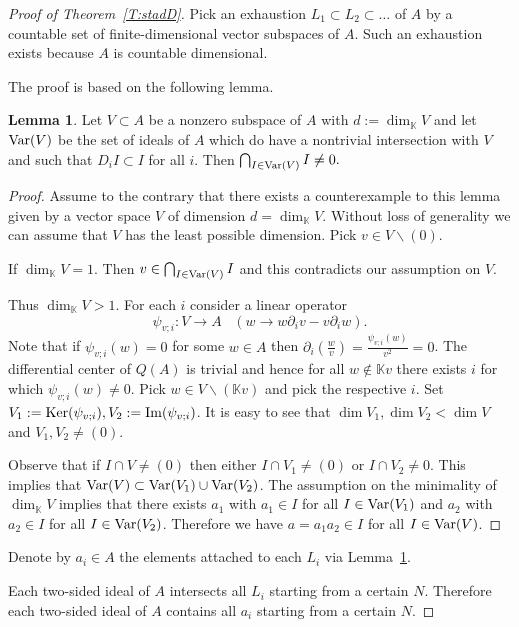 \documentclass{amsart} \textwidth=18.0cm \oddsidemargin=-1cm \evensidemargin=-1cm \topmargin=-1cm \textheight=23cm
\theoremstyle{definition}
\newtheorem{lemma}{Lemma}
\begin{document}
\begin{proof}[Proof of Theorem~\ref{T:stadD}] 

Pick an exhaustion $L_1\subset L_2\subset\ldots$ of $A$ by a countable set of finite-dimensional vector subspaces of $A$. 
Such an exhaustion exists because $A$ is countable dimensional. 

The proof is based on the following lemma.
\begin{lemma}\label{Lbslr1} 
Let $V\subset A$ be a nonzero subspace of $A$ with $d:=\dim_{\mathbb K} V$ and let ${\rm Var}(V)$ be the set of ideals of $A$ which do have a nontrivial intersection with $V$ and such that $D_iI\subset I$ for all $i$. 
Then $\bigcap_{I\in {\rm Var}(V)}I\ne0.$\end{lemma}
\begin{proof} Assume to the contrary that there exists a counterexample to this lemma given by a vector space $V$ of dimension $d=\dim_{\mathbb K}V$. 
Without loss of generality we can assume that $V$ has the least possible dimension. Pick $v\in V\backslash(0).$ 

If $\dim_{\mathbb K} V=1$. Then $v\in \bigcap_{I\in {\rm Var}(V)}I$ and this contradicts our assumption on $V$. 

Thus $\dim_{\mathbb K} V>1$. For each $i$ consider a linear operator $$\psi_{v; i}: V\to A \hspace{10pt}(w\to w\partial_iv-v\partial_iw).$$
Note that if $\psi_{v; i}(w)=0$ for some $w\in A$ then $\partial_i(\frac{w}{v})=\frac{\psi_{v; i}(w)}{v^2}=0$. 
The differential center of $Q(A)$ is trivial and hence for all $w\notin\mathbb K v$ there exists $i$ for which $\psi_{v; i}(w)\ne0$. 
Pick $w\in V\backslash(\mathbb K v)$ and pick the respective $i$. 
Set $V_1:={\rm Ker}(\psi_{v; i}), V_2:={\rm Im}(\psi_{v; i})$. 
It is easy to see that $\dim V_1, \dim V_2<\dim V$ and $V_1, V_2\ne (0)$.

Observe that if $I\cap V\ne(0)$ then either $I\cap V_1\ne(0)$ or $I\cap V_2\ne0$. 
This implies that ${\rm Var}(V)\subset{\rm Var}(V_1)\cup{\rm Var}(V_2)$. 
The assumption on the minimality of $\dim_{\mathbb K} V$ implies that there exists $a_1$ with $a_1\in I$ for all $I\in{\rm Var}(V_1)$ and $a_2$ with $a_2\in I$ for all $I\in{\rm Var}(V_2)$. 
Therefore we have $a=a_1a_2\in I$ for all $I\in{\rm Var}(V)$.
\end{proof}
Denote by $a_i\in A$ the elements attached to each $L_i$ via Lemma~\ref{Lbslr1}. 

Each two-sided ideal of $A$ intersects all $L_i$ starting from a certain $N$. 
Therefore each two-sided ideal of $A$ contains all $a_i$ starting from a certain $N$.
\end{proof}
\end{document}
